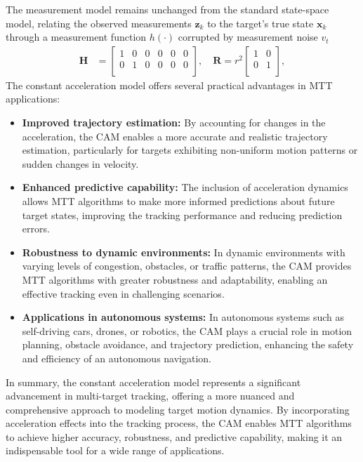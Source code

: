 The measurement model remains unchanged from the standard state-space model, relating the observed measurements $\mathbf{z}_k$ to the target's true state $\mathbf{x}_k$ through a measurement function $h(\cdot)$ corrupted by measurement noise $v_t$
\begin{align}
    \mathbf{H} &=
    \begin{bmatrix}
        1 & 0 & 0 & 0 & 0 & 0 \\
        0 & 1 & 0 & 0 & 0 & 0 \\
    \end{bmatrix},
    \quad \mathbf{R} = r^2
    \begin{bmatrix}
        1 & 0  \\
        0 & 1  \\
    \end{bmatrix},
\end{align}
The constant acceleration model offers several practical advantages in MTT applications:
\begin{itemize}
    \item \textbf{Improved trajectory estimation:} By accounting for changes in the acceleration, the CAM enables a more accurate
    and realistic trajectory estimation, particularly for targets exhibiting non-uniform motion patterns or sudden changes in velocity.
    \item \textbf{Enhanced predictive capability:} The inclusion of acceleration dynamics allows MTT algorithms to make more
    informed predictions about future target states, improving the tracking performance and reducing prediction errors.
    \item \textbf{Robustness to dynamic environments:} In dynamic environments with varying levels of congestion, obstacles,
    or traffic patterns, the CAM provides MTT algorithms with greater robustness and adaptability, enabling an effective tracking even in challenging scenarios.
    \item \textbf{Applications in autonomous systems:} In autonomous systems such as self-driving cars, drones, or robotics,
    the CAM plays a crucial role in motion planning, obstacle avoidance, and trajectory prediction, enhancing the safety and efficiency of an autonomous navigation.
\end{itemize}
In summary, the constant acceleration model represents a significant advancement in multi-target tracking, offering a
more nuanced and comprehensive approach to modeling target motion dynamics. By incorporating acceleration effects
into the tracking process, the CAM enables MTT algorithms to achieve higher accuracy, robustness, and predictive capability, making it an indispensable tool for a wide range of applications.

